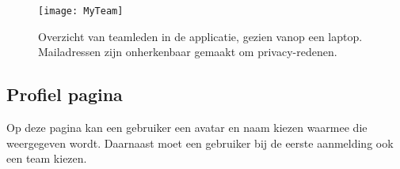 \begin{figure}[h]
    \caption[Overzicht van teamleden]{Overzicht van teamleden in de applicatie, gezien vanop een laptop. Mailadressen zijn onherkenbaar gemaakt om privacy-redenen.}
    \texttt{[image: MyTeam]}
    \label{fig:team}
\end{figure}

\subsection{Profiel pagina}

Op deze pagina kan een gebruiker een avatar en naam kiezen waarmee die weergegeven wordt. Daarnaast moet een gebruiker bij de eerste aanmelding ook een team kiezen.